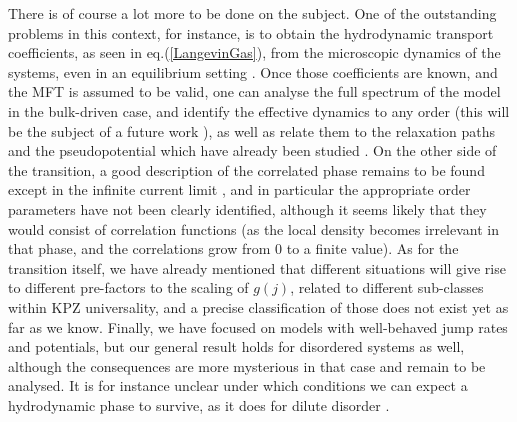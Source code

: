 \documentclass[aps,pre,onecolumn,showpacs,showkeys,a4paper]{revtex4-1}
\begin{document}
There is of course a lot more to be done on the subject. One of the outstanding problems in this context, for instance, is to obtain the hydrodynamic transport coefficients, as seen in eq.(\ref{LangevinGas}), from the microscopic dynamics of the systems, even in an equilibrium setting \cite{Arita2014,Arita2016}. Once those coefficients are known, and the MFT is assumed to be valid, one can analyse the full spectrum of the model in the bulk-driven case, and identify the effective dynamics to any order (this will be the subject of a future work \cite{Lazarescu}), as well as relate them to the relaxation paths and the pseudopotential which have already been studied \cite{Bahadoran2010}. On the other side of the transition, a good description of the correlated phase remains to be found except in the infinite current limit \cite{Karevski2016}, and in particular the appropriate order parameters have not been clearly identified, although it seems likely that they would consist of correlation functions (as the local density becomes irrelevant in that phase, and the correlations grow from $0$ to a finite value). As for the transition itself, we have already mentioned that different situations will give rise to different pre-factors to the scaling of $g(j)$, related to different sub-classes within KPZ universality, and a precise classification of those does not exist yet as far as we know. Finally, we have focused on models with well-behaved jump rates and potentials, but our general result holds for disordered systems as well, although the consequences are more mysterious in that case and remain to be analysed. It is for instance unclear under which conditions we can expect a hydrodynamic phase to survive, as it does for dilute disorder \cite{Bahadoran2016}.

~
\end{document}
